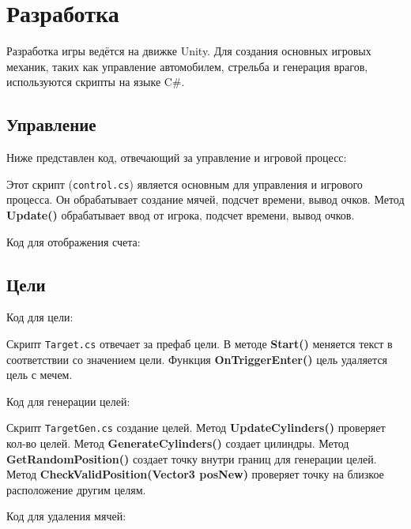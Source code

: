 \section{Разработка}

Разработка игры ведётся на движке Unity.
Для создания основных игровых механик,
таких как управление автомобилем, стрельба и генерация врагов,
используются скрипты на языке C\#.

\subsection{Управление }

Ниже представлен код, отвечающий за управление и игровой процесс:


Этот скрипт (\texttt{control.cs}) является основным для управления и игрового процесса.
Он обрабатывает создание мячей, подсчет времени, вывод очков.
Метод \textbf{Update()}
обрабатывает ввод от игрока, подсчет времени, вывод очков.

Код для отображения счета:



\subsection{Цели}

Код для цели:


Скрипт \texttt{Target.cs} отвечает за префаб цели.
В методе \textbf{Start()} меняется текст в соответствии со значением цели.
Функция \textbf{OnTriggerEnter()} цель удаляется цель с мечем.

Код для генерации целей:


Скрипт \texttt{TargetGen.cs} создание целей.
Метод \textbf{UpdateCylinders()} проверяет кол-во целей.
Метод \textbf{GenerateCylinders()} создает цилиндры.
Метод \textbf{GetRandomPosition()} создает точку внутри границ для генерации целей.
Метод \textbf{CheckValidPosition(Vector3 posNew)} проверяет точку на близкое расположение другим целям.
                                                                               
Код для удаления мячей:


